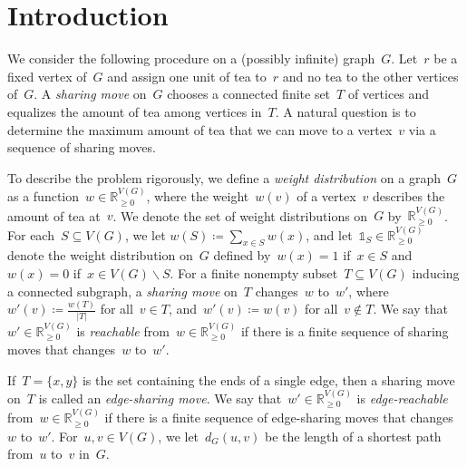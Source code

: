 \documentclass[reqno, 12pt]{amsart}
\numberwithin{equation}{section}
\numberwithin{figure}{section}
\theoremstyle{plain}
\theoremstyle{definition}
\let\setminus=\smallsetminus
\newcommand*{\abs}[1]{\ensuremath{{\left\lvert {#1} \right\rvert}}}
\newcommand*{\weights}{\ensuremath{\mathbb{R}_{\geq 0}^{V(G)}}}
\begin{document}


\date{}

\maketitle

\section{Introduction}	
\label{sec:intro}

We consider the following procedure on a (possibly infinite) graph~$G$.
Let~$r$ be a fixed vertex of~$G$ and assign one unit of tea to~$r$ and no tea to the other vertices of~$G$.  
A \emph{sharing move} on~$G$ chooses a connected finite set~$T$ of vertices and equalizes the amount of tea among vertices in~$T$. 
A natural question is to determine the maximum amount of tea that we can move to a vertex~$v$  via a sequence of sharing moves. 

To describe the problem rigorously, we define a \emph{weight distribution} on a graph~$G$ as a function~${w \in \weights}$, where the weight~${w(v)}$ of a vertex~$v$ describes the amount of tea at~$v$. 
We denote the set of weight distributions on~$G$ by~$\mathbb{R}_{\geq 0}^{V(G)}$. 
For each~${S \subseteq V(G)}$, we let ${w(S) \coloneqq \sum_{x \in S} w(x)}$, 
and let~${\mathds{1}_S \in \weights}$ denote the weight distribution on~$G$ defined by~${w(x) = 1}$ if~${x \in S}$ and~${w(x) = 0}$ if~${x \in V(G) \setminus S}$. 
For a finite nonempty subset~${T \subseteq V(G)}$ inducing a connected subgraph, a \emph{sharing move} on~$T$ changes~$w$ to~$w'$, where~${w'(v) \coloneqq \frac{w(T)}{\abs{T}}}$ for all~${v \in T}$, and~${w'(v) \coloneqq w(v)}$ for all~${v \notin T}$. 
We say that~${w' \in \weights}$ is \emph{reachable} from~${w \in \weights}$ if there is a finite sequence of sharing moves that changes~$w$ to~$w'$. 

If~${T = \{x,y\}}$ is the set containing the ends of a single edge, then a sharing move on~$T$ is called an \emph{edge-sharing move}. 
We say that~${w' \in \weights}$ is \emph{edge-reachable} from~${w \in \weights}$ if there is a finite sequence of edge-sharing moves that changes~$w$ to~$w'$. 
For~${u,v \in V(G)}$, we let~${d_G(u,v)}$ be the length of a shortest path from~$u$ to~$v$ in~$G$. 
\end{document}
